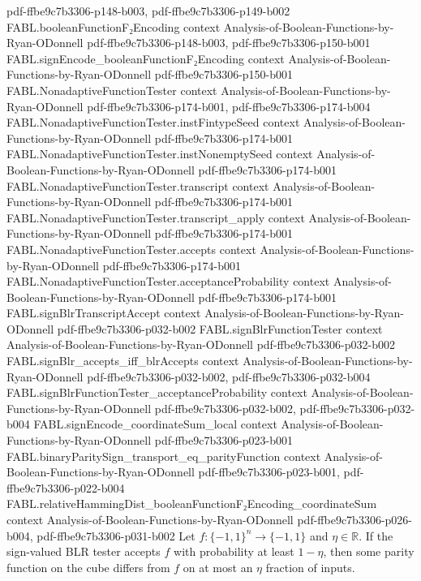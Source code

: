 \begin{theorem}
  {pdf-ffbe9c7b3306-p148-b003,
    pdf-ffbe9c7b3306-p149-b002}
\proofstep
  {FABL.booleanFunctionF₂Encoding}
  {context}
  {Analysis-of-Boolean-Functions-by-Ryan-ODonnell}
  {pdf-ffbe9c7b3306-p148-b003,
    pdf-ffbe9c7b3306-p150-b001}
\proofstep
  {FABL.signEncode_booleanFunctionF₂Encoding}
  {context}
  {Analysis-of-Boolean-Functions-by-Ryan-ODonnell}
  {pdf-ffbe9c7b3306-p150-b001}
\proofstep
  {FABL.NonadaptiveFunctionTester}
  {context}
  {Analysis-of-Boolean-Functions-by-Ryan-ODonnell}
  {pdf-ffbe9c7b3306-p174-b001,
    pdf-ffbe9c7b3306-p174-b004}
\proofstep
  {FABL.NonadaptiveFunctionTester.instFintypeSeed}
  {context}
  {Analysis-of-Boolean-Functions-by-Ryan-ODonnell}
  {pdf-ffbe9c7b3306-p174-b001}
\proofstep
  {FABL.NonadaptiveFunctionTester.instNonemptySeed}
  {context}
  {Analysis-of-Boolean-Functions-by-Ryan-ODonnell}
  {pdf-ffbe9c7b3306-p174-b001}
\proofstep
  {FABL.NonadaptiveFunctionTester.transcript}
  {context}
  {Analysis-of-Boolean-Functions-by-Ryan-ODonnell}
  {pdf-ffbe9c7b3306-p174-b001}
\proofstep
  {FABL.NonadaptiveFunctionTester.transcript_apply}
  {context}
  {Analysis-of-Boolean-Functions-by-Ryan-ODonnell}
  {pdf-ffbe9c7b3306-p174-b001}
\proofstep
  {FABL.NonadaptiveFunctionTester.accepts}
  {context}
  {Analysis-of-Boolean-Functions-by-Ryan-ODonnell}
  {pdf-ffbe9c7b3306-p174-b001}
\proofstep
  {FABL.NonadaptiveFunctionTester.acceptanceProbability}
  {context}
  {Analysis-of-Boolean-Functions-by-Ryan-ODonnell}
  {pdf-ffbe9c7b3306-p174-b001}
\proofstep
  {FABL.signBlrTranscriptAccept}
  {context}
  {Analysis-of-Boolean-Functions-by-Ryan-ODonnell}
  {pdf-ffbe9c7b3306-p032-b002}
\proofstep
  {FABL.signBlrFunctionTester}
  {context}
  {Analysis-of-Boolean-Functions-by-Ryan-ODonnell}
  {pdf-ffbe9c7b3306-p032-b002}
\proofstep
  {FABL.signBlr_accepts_iff_blrAccepts}
  {context}
  {Analysis-of-Boolean-Functions-by-Ryan-ODonnell}
  {pdf-ffbe9c7b3306-p032-b002,
    pdf-ffbe9c7b3306-p032-b004}
\proofstep
  {FABL.signBlrFunctionTester_acceptanceProbability}
  {context}
  {Analysis-of-Boolean-Functions-by-Ryan-ODonnell}
  {pdf-ffbe9c7b3306-p032-b002,
    pdf-ffbe9c7b3306-p032-b004}
\proofstep
  {FABL.signEncode_coordinateSum_local}
  {context}
  {Analysis-of-Boolean-Functions-by-Ryan-ODonnell}
  {pdf-ffbe9c7b3306-p023-b001}
\proofstep
  {FABL.binaryParitySign_transport_eq_parityFunction}
  {context}
  {Analysis-of-Boolean-Functions-by-Ryan-ODonnell}
  {pdf-ffbe9c7b3306-p023-b001,
    pdf-ffbe9c7b3306-p022-b004}
\proofstep
  {FABL.relativeHammingDist_booleanFunctionF₂Encoding_coordinateSum}
  {context}
  {Analysis-of-Boolean-Functions-by-Ryan-ODonnell}
  {pdf-ffbe9c7b3306-p026-b004,
    pdf-ffbe9c7b3306-p031-b002}
Let $f:\{−1,1\}^n\to\{−1,1\}$ and $\eta\in\mathbb R$. If the sign-valued BLR
tester accepts $f$ with probability at least $1-\eta$, then some parity function on the
cube differs from $f$ on at most an $\eta$ fraction of inputs.
\end{theorem}

